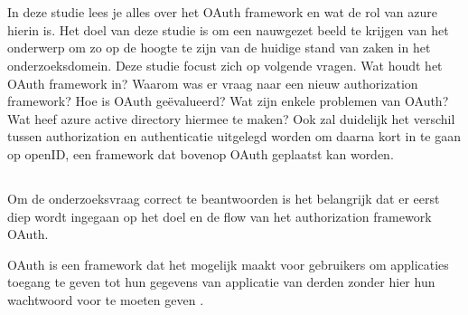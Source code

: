 \chapter{}
\label{ch:stand-van-zaken}



In deze studie lees je alles over het OAuth framework en wat de rol van azure hierin is. Het doel van deze studie is om een nauwgezet beeld te krijgen van het onderwerp om zo op de hoogte te zijn van de huidige stand van zaken in het onderzoeksdomein. Deze studie focust zich op volgende vragen. Wat houdt het OAuth framework in? Waarom was er vraag naar een nieuw authorization framework? Hoe is OAuth geëvalueerd? Wat zijn enkele problemen van OAuth? Wat heef azure active directory hiermee te maken? Ook zal duidelijk het verschil tussen authorization en authenticatie uitgelegd worden om daarna kort in te gaan op openID, een framework dat bovenop OAuth geplaatst kan worden.
\section{}
\label{sec:OAuthFramework}
Om de onderzoeksvraag correct te beantwoorden is het belangrijk dat er eerst diep wordt ingegaan op het doel en de flow van het authorization framework OAuth.

OAuth is een framework dat het mogelijk maakt voor gebruikers om applicaties toegang te geven tot hun gegevens van applicatie van derden zonder hier hun wachtwoord voor te moeten geven \autocite{Deniss2016}.

